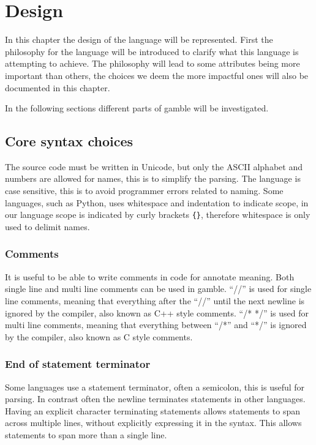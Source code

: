 \chapter{Design}
\label{cha:Design}
In this chapter the design of the language will be represented.
First the philosophy for the language will be introduced to clarify what this language is attempting to achieve.
The philosophy will lead to some attributes being more important than others, the choices we deem the more impactful ones will also be documented in this chapter.



In the following sections different parts of \gls{gamble} will be investigated.

\section{Core syntax choices}

The source code must be written in Unicode, but only the ASCII alphabet and numbers are allowed for names, this is to simplify the parsing. 
The language is case sensitive, this is to avoid programmer errors related to naming. 
Some languages, such as Python, uses whitespace and indentation to indicate scope, in our language scope is indicated by curly brackets \texttt{\{\}}, therefore whitespace is only used to delimit names. 

\subsection*{Comments}
It is useful to be able to write comments in code for annotate meaning.
Both single line and multi line comments can be used in \gls{gamble}. 
``//'' is used for single line comments, meaning that everything after the ``//'' until the next newline is ignored by the compiler, also known as C++ style comments. 
``/* */'' is used for multi line comments, meaning that everything between ``/*'' and ``*/'' is ignored by the compiler, also known as C style comments. 

\subsection*{End of statement terminator}
Some languages use a statement terminator, often a semicolon, this is useful for parsing.
In contrast often the newline terminates statements in other languages.
Having an explicit character terminating statements allows statements to span across multiple lines, without explicitly expressing it in the syntax.
This allows statements to span more than a single line.

